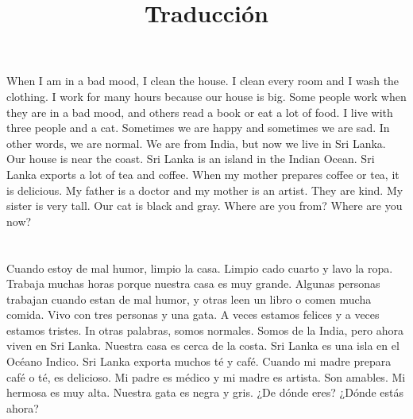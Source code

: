 \documentclass[12pt]{article}
\title{Traducción}
\begin{document}
\section*{}

When I am in a bad mood, I clean the house. I clean every room and I wash the clothing. I work for many hours because our house is big. Some people work when they are in a bad mood, and others read a book or eat a lot of food. I live with three people and a cat. Sometimes we are happy and sometimes we are sad. In other words, we are normal. We are from India, but now we live in Sri Lanka. Our house is near the coast. Sri Lanka is an island in the Indian Ocean. Sri Lanka exports a lot of tea and coffee. When my mother prepares coffee or tea, it is delicious. My father is a doctor and my mother is an artist. They are kind. My sister is very tall. Our cat is black and gray. Where are you from? Where are you now?

\section*{}

Cuando estoy de mal humor, limpio la casa. Limpio cado cuarto y lavo la ropa. Trabaja muchas horas porque nuestra casa es muy grande. Algunas personas trabajan cuando estan de mal humor, y otras leen un libro o comen mucha comida. Vivo con tres personas y una gata. A veces estamos felices y a veces estamos tristes. In otras palabras, somos normales. Somos de la India, pero ahora viven en Sri Lanka. Nuestra casa es cerca de la costa. Sri Lanka es una isla en el Océano Indico. Sri Lanka exporta muchos té y café. Cuando mi madre prepara café o té, es delicioso. Mi padre es médico y mi madre es artista. Son amables. Mi hermosa es muy alta. Nuestra gata es negra y gris. ¿De dónde eres? ¿Dónde estás ahora?
\end{document}
